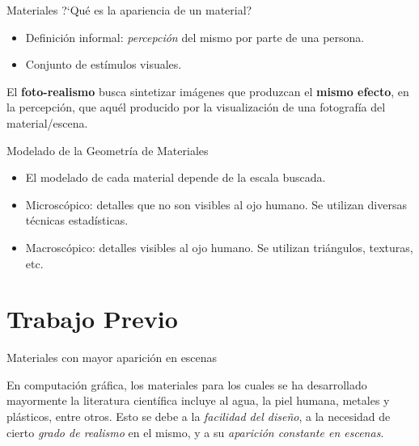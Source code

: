 \documentclass[spanish]{beamer}
\begin{document}
\begin{frame}{Materiales}
?`Qué es la apariencia de un material?
\begin{itemize}
\item Definición informal: {\em percepción} del mismo por parte de una persona.
\item Conjunto de estímulos visuales.
\end{itemize}

El \textbf{foto-realismo} busca sintetizar imágenes que produzcan el \textbf{mismo efecto}, en la percepción, que aquél producido por la visualización de una fotografía del material/escena.
\end{frame}
\begin{frame}{Modelado de la Geometría de Materiales}
\begin{itemize}
\item El modelado de cada material depende de la escala buscada.
\item Microscópico: detalles que no son visibles al ojo humano. Se utilizan diversas técnicas estadísticas.
\item Macroscópico: detalles visibles al ojo humano. Se utilizan triángulos, texturas, etc.
\end{itemize}
\end{frame}




\section{Trabajo Previo}

\begin{frame}{Materiales con mayor aparición en escenas}

En computación gráfica, los materiales para los cuales se ha desarrollado mayormente la literatura científica incluye al agua, la piel humana, metales y plásticos, entre otros. Esto se debe a la {\em facilidad del diseño}, a la necesidad de cierto {\em grado de realismo} en el mismo, y a su {\em aparición constante en escenas}.

\end{frame}
\end{document}

